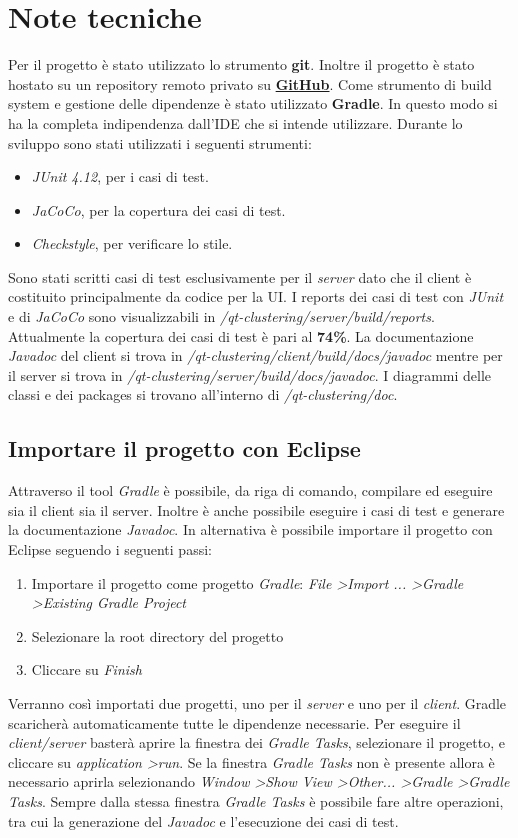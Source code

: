 \documentclass{article}
\begin{document}
	\section{Note tecniche}
	Per il progetto è stato utilizzato lo strumento \textbf{git}. Inoltre
	il progetto è stato hostato su un repository remoto privato su
	\href{https://github.com}{\textbf{GitHub}}. Come strumento di build
	system e gestione delle dipendenze è stato utilizzato \textbf{Gradle}.
	In questo modo si ha la completa indipendenza dall'IDE che si intende
	utilizzare. 
	Durante lo sviluppo sono stati utilizzati i seguenti strumenti:
	\begin{itemize}
		\item \textit{JUnit 4.12}, per i casi di test.
		\item \textit{JaCoCo}, per la copertura dei casi di test.
		\item \textit{Checkstyle}, per verificare lo stile.
	\end{itemize}
	Sono stati scritti casi di test esclusivamente per il \textit{server}
	dato che il client è costituito principalmente da codice per la UI.
	I reports dei casi di test con \textit{JUnit} e di \textit{JaCoCo} sono
	visualizzabili in \textit{/qt-clustering/server/build/reports}.
	Attualmente la copertura dei casi di test è pari al \textbf{74\%}.
	La documentazione \textit{Javadoc} del client si trova in
	\textit{/qt-clustering/client/build/docs/javadoc} mentre per il server
	si trova in \textit{/qt-clustering/server/build/docs/javadoc}.
	I diagrammi delle classi e dei packages si trovano all'interno di
	\textit{/qt-clustering/doc}.

	\subsection {Importare il progetto con Eclipse}
	Attraverso il tool \textit{Gradle} è possibile, da riga di comando,
	compilare ed eseguire sia il client sia il server. Inoltre è anche
	possibile eseguire i casi di test e generare la documentazione
	\textit{Javadoc}.
	In alternativa è possibile importare il progetto con
	Eclipse seguendo i seguenti passi:
	\begin{enumerate}
		\item Importare il progetto come progetto \textit{Gradle}:
			\textit{File \textgreater Import ... \textgreater Gradle
			\textgreater Existing Gradle Project}
		\item Selezionare la root directory del progetto
		\item Cliccare su \textit{Finish}
	\end{enumerate}
	Verranno così importati due progetti, uno per il \textit{server} e uno
	per il \textit{client}. Gradle scaricherà automaticamente tutte le
	dipendenze necessarie. Per eseguire il \textit{client/server} basterà
	aprire la finestra dei \textit{Gradle Tasks}, selezionare il progetto,
	e cliccare su \textit{application \textgreater run}. Se la finestra
	\textit{Gradle Tasks} non è presente allora è necessario aprirla
	selezionando \textit{Window \textgreater Show View \textgreater Other...
	\textgreater Gradle \textgreater Gradle Tasks}. Sempre dalla stessa
	finestra \textit{Gradle Tasks} è possibile fare altre operazioni, tra
	cui la generazione del \textit{Javadoc} e l'esecuzione dei casi di test.
\end{document}

